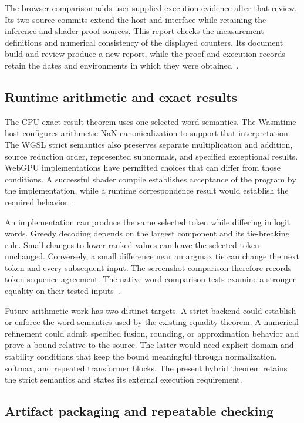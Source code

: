 The browser comparison adds user-supplied execution evidence after that review.  Its two source commits extend the host and interface while retaining the inference and shader proof sources.  This report checks the measurement definitions and numerical consistency of the displayed counters.  Its document build and review produce a new report, while the proof and execution records retain the dates and environments in which they were obtained~\cite{browser-source,browser-tests,screenshots}.

\subsection{Runtime arithmetic and exact results}

The CPU exact-result theorem uses one selected word semantics.  The Wasmtime host configures arithmetic NaN canonicalization to support that interpretation.  The WGSL strict semantics also preserves separate multiplication and addition, source reduction order, represented subnormals, and specified exceptional results.  WebGPU implementations have permitted choices that can differ from those conditions.  A successful shader compile establishes acceptance of the program by the implementation, while a runtime correspondence result would establish the required behavior~\cite{wasmtime,wg-wgsl,wg-execution}.

An implementation can produce the same selected token while differing in logit words.  Greedy decoding depends on the largest component and its tie-breaking rule.  Small changes to lower-ranked values can leave the selected token unchanged.  Conversely, a small difference near an argmax tie can change the next token and every subsequent input.  The screenshot comparison therefore records token-sequence agreement.  The native word-comparison tests examine a stronger equality on their tested inputs~\cite{wg-tests,screenshots}.

Future arithmetic work has two distinct targets.  A strict backend could establish or enforce the word semantics used by the existing equality theorem.  A numerical refinement could admit specified fusion, rounding, or approximation behavior and prove a bound relative to the source.  The latter would need explicit domain and stability conditions that keep the bound meaningful through normalization, softmax, and repeated transformer blocks.  The present hybrid theorem retains the strict semantics and states its external execution requirement.

\subsection{Artifact packaging and repeatable checking}

